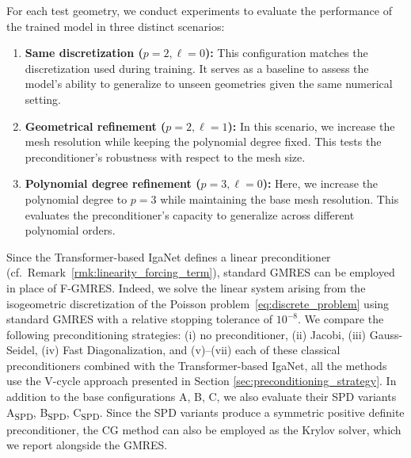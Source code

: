 \documentclass{article}
\newcommand{\reflevel}{\ell} %
\theoremstyle{plain}
\numberwithin{equation}{section}
\begin{document}
For each test geometry, we conduct experiments to evaluate the performance of the trained model in three distinct scenarios:
\begin{enumerate}
    \item \textbf{Same discretization ($p=2, \reflevel=0$):} This configuration matches the discretization used during training. It serves as a baseline to assess the model's ability to generalize to unseen geometries given the same numerical setting.
    \item \textbf{Geometrical refinement ($p=2, \reflevel=1$):} In this scenario, we increase the mesh resolution while keeping the polynomial degree fixed. This tests the preconditioner's robustness with respect to the mesh size.
    \item \textbf{Polynomial degree refinement ($p=3, \reflevel=0$):} Here, we increase the polynomial degree to $p=3$ while maintaining the base mesh resolution. This evaluates the preconditioner's capacity to generalize across different polynomial orders.
\end{enumerate}

Since the Transformer-based IgaNet defines a linear preconditioner (cf.~Remark~\ref{rmk:linearity_forcing_term}), standard GMRES can be employed in place of F-GMRES. Indeed, we solve the linear system arising from the isogeometric discretization of the Poisson problem~\eqref{eq:discrete_problem} using standard GMRES with a relative stopping tolerance of $10^{-8}$. We compare the following preconditioning strategies: (i) no preconditioner, (ii) Jacobi, (iii) Gauss-Seidel, (iv) Fast Diagonalization, and (v)--(vii) each of these classical preconditioners combined with the Transformer-based IgaNet, all the methods use the V-cycle approach presented in Section \ref{sec:preconditioning_strategy}. 
In addition to the base configurations A, B, C, we also evaluate their SPD variants A\textsubscript{SPD}, B\textsubscript{SPD}, C\textsubscript{SPD}.
Since the SPD variants produce a symmetric positive definite preconditioner, the CG method can also be employed as the Krylov solver, which we report alongside the GMRES.
\end{document}
